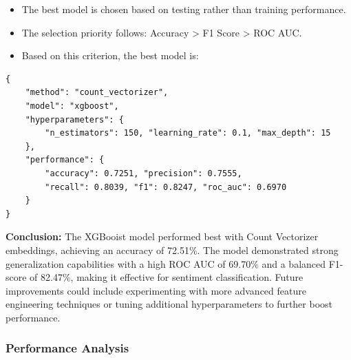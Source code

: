 \begin{itemize}
    \item The best model is chosen based on testing rather than training performance.
    \item The selection priority follows: Accuracy > F1 Score > ROC AUC.
    \item Based on this criterion, the best model is:
\end{itemize}

\begin{verbatim}
{
    "method": "count_vectorizer",
    "model": "xgboost",
    "hyperparameters": {
        "n_estimators": 150, "learning_rate": 0.1, "max_depth": 15
    },
    "performance": {
        "accuracy": 0.7251, "precision": 0.7555,
        "recall": 0.8039, "f1": 0.8247, "roc_auc": 0.6970
    }
}
\end{verbatim}

\textbf{Conclusion:} The XGBooist model performed best with Count Vectorizer embeddings, achieving an accuracy of 72.51\%. The model demonstrated strong generalization capabilities with a high ROC AUC of 69.70\% and a balanced F1-score of 82.47\%, making it effective for sentiment classification. Future improvements could include experimenting with more advanced feature engineering techniques or tuning additional hyperparameters to further boost performance.

\subsubsection{Performance Analysis}

